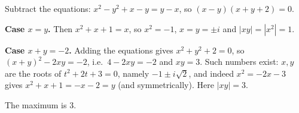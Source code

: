 Subtract the equations: $x^2-y^2+x-y=y-x$, so $(x-y)(x+y+2)=0$.

\textbf{Case $x=y$.} Then $x^2+x+1=x$, so $x^2=-1$, $x=y=\pm i$ and $|xy|=|x^2|=1$.

\textbf{Case $x+y=-2$.} Adding the equations gives $x^2+y^2+2=0$, so $(x+y)^2-2xy=-2$, i.e.\ $4-2xy=-2$ and $xy=3$. Such numbers exist: $x,y$ are the roots of $t^2+2t+3=0$, namely $-1\pm i\sqrt2$, and indeed $x^2=-2x-3$ gives $x^2+x+1=-x-2=y$ (and symmetrically). Here $|xy|=3$.

The maximum is $\boxed{3}$.
